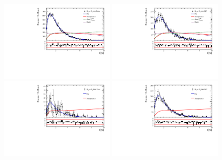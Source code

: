 \begin{figure}[h]
\caption{}
\label{fig:}
\includegraphics[height=!,width=0.49\textwidth]{figs/Acceptance/adaptive_N4/timeAccRatioFit_norm_Run1_t1.pdf}
\includegraphics[height=!,width=0.49\textwidth]{figs/Acceptance/adaptive_N4/timeAccRatioFit_norm_MC_Run1_t1.pdf}
\includegraphics[height=!,width=0.49\textwidth]{figs/Acceptance/adaptive_N4/timeAccRatioFit_signal_B0_Run1_t1.pdf}
\includegraphics[height=!,width=0.49\textwidth]{figs/Acceptance/adaptive_N4/timeAccRatioFit_signal_MC_Run1_t1.pdf}
\caption{}
\label{fig:}
\end{figure}

\clearpage

